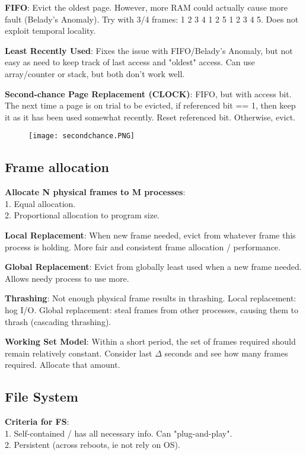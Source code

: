 \documentclass[a4paper,landscape]{article}
\newcommand{\rntopic}[1]{\vspace{-1.5em}\subsection*{#1}\vspace{-0.5em}}
\newcommand{\rnsubtopic}[1]{\vspace{-1.5em}\subsection*{#1}\vspace{-1.0em}}
\newcommand{\rnname}[1]{\textbf{#1}}
\begin{document}
\begin{multicols*}{4}
\begin{flatitemize}
\item \rnname{FIFO}: Evict the oldest page. However, more RAM could actually cause more fault (Belady's Anomaly). Try with 3/4 frames: 1 2 3 4 1 2 5 1 2 3 4 5. Does not exploit temporal locality.
\item \rnname{Least Recently Used}: Fixes the issue with FIFO/Belady's Anomaly, but not easy as need to keep track of last access and "oldest" access. Can use array/counter or stack, but both don't work well.
\item \rnname{Second-chance Page Replacement (CLOCK)}: FIFO, but with access bit. The next time a page is on trial to be evicted, if referenced bit == 1, then keep it as it has been used somewhat recently. Reset referenced bit. Otherwise, evict. 
\vspace{-1.5em}
\begin{figure}[H]
  \texttt{[image: secondchance.PNG]}
\end{figure}
\vspace{-1.5em}
\rnsubtopic{Frame allocation}
\item \rnname{Allocate N physical frames to M processes}: \\
1. Equal allocation. \\
2. Proportional allocation to program size.
\item \rnname {Local Replacement}: When new frame needed, evict from whatever frame this process is holding. More fair and consistent frame allocation / performance.
\item \rnname{Global Replacement}: Evict from globally least used when a new frame needed. Allows needy process to use more.
\item \rnname{Thrashing}: Not enough physical frame results in thrashing. Local replacement: hog I/O. Global replacement: steal frames from other processes, causing them to thrash (cascading thrashing).
\item \rnname{Working Set Model}: Within a short period, the set of frames required should remain relatively constant. Consider last $\Delta$ seconds and see how many frames required. Allocate that amount. 
\end{flatitemize}
\rntopic{File System}
\begin{flatitemize}
\item \rnname{Criteria for FS}:\\
1. Self-contained / has all necessary info. Can "plug-and-play".\\
2. Persistent (across reboots, ie not rely on OS).\\

\end{flatitemize}
\end{multicols*}
\end{document}
